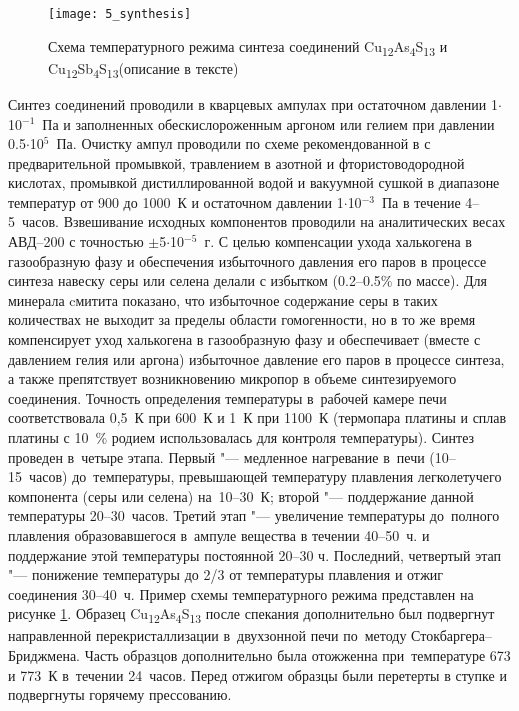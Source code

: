 \begin{figure}[pt!]
  \begin{minipage}[ht]{0.99\linewidth}\centering
    \texttt{[image: 5\_synthesis]}
  \end{minipage}
       \caption[Схема температурного режима синтеза соединений Cu\textsubscript{12}As\textsubscript{4}S\textsubscript{13} и Cu\textsubscript{12}Sb\textsubscript{4}S\textsubscript{13}]{Схема температурного режима синтеза соединений Cu\textsubscript{12}As\textsubscript{4}S\textsubscript{13} и Cu\textsubscript{12}Sb\textsubscript{4}S\textsubscript{13}(описание в тексте)}
    \label{img:figure3}
\end{figure}

Синтез соединений проводили в кварцевых ампулах при остаточном давлении 1$\cdot$10$^{-1}$~Па и заполненных обескислороженным аргоном или гелием при давлении 0.5$\cdot$10$^{5}$~Па. Очистку ампул проводили по схеме рекомендованной в \cite{156} с предварительной промывкой, травлением в азотной и фтористоводородной кислотах, промывкой дистиллированной водой и вакуумной сушкой в диапазоне температур от 900 до 1000~К и остаточном давлении 1$\cdot$10$^{-3}$~Па в течение 4--5~часов. Взвешивание исходных компонентов проводили на аналитических весах АВД--200 с точностью $\pm$5$\cdot$10$^{-5}$~г.
С целью компенсации ухода халькогена в газообразную фазу и обеспечения избыточного давления его паров в процессе синтеза навеску серы или селена делали с избытком (0.2--0.5\% по массе).
Для минерала cмитита показано\cite{181}, что избыточное содержание серы в таких количествах не выходит за пределы области гомогенности, но в то же время компенсирует уход халькогена в газообразную фазу и обеспечивает (вместе с давлением гелия или аргона) избыточное давление его паров в процессе синтеза, а также препятствует возникновению микропор в объеме синтезируемого соединения.
Точность определения температуры в~рабочей камере печи соответствовала 0,5~К при 600~К и 1~К при 1100~К (термопара платины и сплав платины с 10~\% родием использовалась для контроля температуры). Синтез проведен в~четыре этапа. Первый "--- медленное нагревание в~печи (10--15~часов) до~температуры, превышающей температуру плавления легколетучего компонента (серы или селена) на~10--30~К; второй "--- поддержание данной температуры 20--30~часов. Третий этап "--- увеличение температуры до~полного плавления образовавшегося в~ампуле вещества в течении 40--50~ч. и поддержание этой температуры постоянной 20--30 ч. Последний, четвертый этап  "--- понижение температуры до 2/3 от температуры плавления и отжиг соединения 30--40~ч.
 Пример схемы температурного режима представлен на рисунке \ref{img:figure3}. Образец Cu\textsubscript{12}As\textsubscript{4}S\textsubscript{13} после спекания дополнительно был подвергнут направленной перекристаллизации в~двухзонной печи по~методу Стокбаргера--Бриджмена. Часть образцов дополнительно была отожженна при~температуре 673 и 773~К в~течении 24~часов.
Перед отжигом образцы были перетерты в ступке и подвергнуты горячему прессованию.

